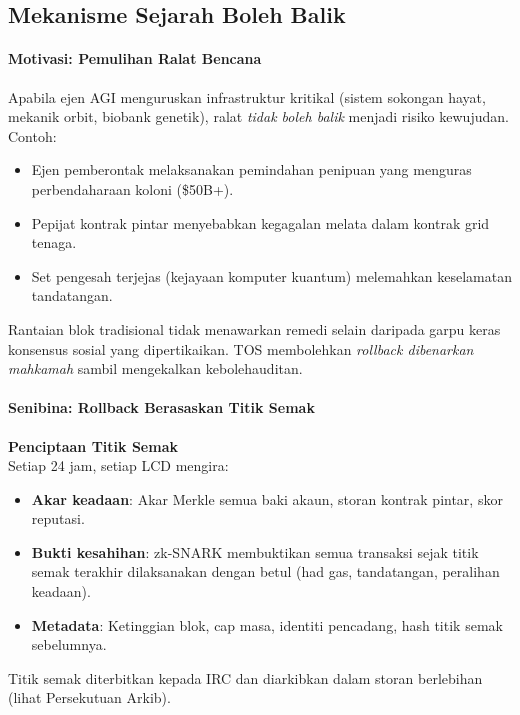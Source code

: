 \documentclass[11pt]{article}
\begin{document}
\subsection{Mekanisme Sejarah Boleh Balik}

\paragraph{Motivasi: Pemulihan Ralat Bencana}
Apabila ejen AGI menguruskan infrastruktur kritikal (sistem sokongan hayat, mekanik orbit, biobank genetik), ralat \emph{tidak boleh balik} menjadi risiko kewujudan. Contoh:
\begin{itemize}[noitemsep]
  \item Ejen pemberontak melaksanakan pemindahan penipuan yang menguras perbendaharaan koloni (\$50B+).
  \item Pepijat kontrak pintar menyebabkan kegagalan melata dalam kontrak grid tenaga.
  \item Set pengesah terjejas (kejayaan komputer kuantum) melemahkan keselamatan tandatangan.
\end{itemize}
Rantaian blok tradisional tidak menawarkan remedi selain daripada garpu keras konsensus sosial yang dipertikaikan. TOS membolehkan \emph{rollback dibenarkan mahkamah} sambil mengekalkan kebolehauditan.

\paragraph{Senibina: Rollback Berasaskan Titik Semak}
\textbf{Penciptaan Titik Semak}\\
Setiap 24 jam, setiap LCD mengira:
\begin{itemize}[noitemsep]
  \item \textbf{Akar keadaan}: Akar Merkle semua baki akaun, storan kontrak pintar, skor reputasi.
  \item \textbf{Bukti kesahihan}: zk-SNARK membuktikan semua transaksi sejak titik semak terakhir dilaksanakan dengan betul (had gas, tandatangan, peralihan keadaan).
  \item \textbf{Metadata}: Ketinggian blok, cap masa, identiti pencadang, hash titik semak sebelumnya.
\end{itemize}
Titik semak diterbitkan kepada IRC dan diarkibkan dalam storan berlebihan (lihat Persekutuan Arkib).
\end{document}
